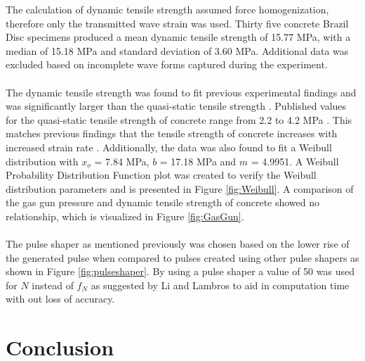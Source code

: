 \documentclass[12pt]{article}
\begin{document}
The calculation of dynamic tensile strength assumed force homogenization, therefore only the transmitted wave strain was used. Thirty five concrete Brazil Disc specimens produced a mean dynamic tensile strength of 15.77 MPa, with a median of 15.18 MPa and standard deviation of 3.60 MPa. Additional data was excluded based on incomplete wave forms captured during the experiment. 
\\ \\
The dynamic tensile strength was found to fit previous experimental findings and was significantly larger than the quasi-static tensile strength \cite{Jin2017}. Published values for the quasi-static tensile strength of concrete range from 2.2 to 4.2 MPa \cite{Concrete}. This matches previous findings that the tensile strength of concrete increases with increased strain rate \cite{Jin2017} \cite{Grote}. Additionally, the data was also found to fit a Weibull distribution with $x_{o}$ = 7.84 MPa, $b$ = 17.18 MPa and $m$ = 4.9951. A Weibull Probability Distribution Function plot was created to verify the Weibull distribution parameters and is presented in Figure \ref{fig:Weibull}. A comparison of the gas gun pressure and dynamic tensile strength of concrete showed no relationship, which is visualized in Figure \ref{fig:GasGun}.  
\\ \\
The pulse shaper as mentioned previously was chosen based on the lower rise of the generated pulse when compared to pulses created using other pulse shapers as shown in Figure \ref{fig:pulseshaper}. By using a pulse shaper a value of 50 was used for $N$ instead of $f_N$ as suggested by Li and Lambros \cite{Li} to aid in computation time with out loss of accuracy.

\section{Conclusion} %

\end{document}
